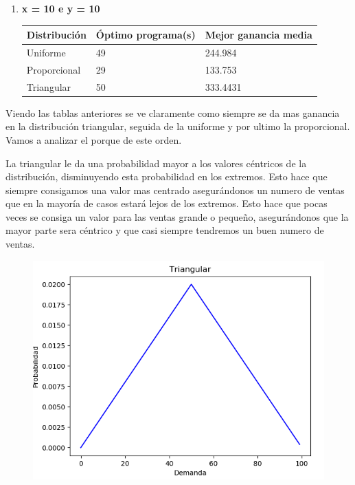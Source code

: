 \documentclass[]{article}
\begin{document}
\begin{enumerate}
\begin{table}[H]
\begin{center}
\begin{tabular}{|l|l|l|l|l|}
				\end{tabular}
			
			\label{tabla:sencilla}
		\end{center}
	\end{table}
	\item \textbf{ x = 10 e y = 10}
	\begin{table}[H]
		\begin{center}
				\begin{tabular}{|l|l|l|}
					
					\hline
					Distribución & Óptimo programa(s) & Mejor ganancia media\\
					\hline \hline
					Uniforme & 49 & 244.984
					\\ \hline
					Proporcional & 29& 133.753
					\\ \hline
					Triangular & 50 & 333.4431
					\\ \hline
					
				\end{tabular}
		
			\label{tabla:sencilla}
		\end{center}
	\end{table}
\end{enumerate}

Viendo las tablas anteriores se ve claramente como siempre se da mas ganancia en la distribución triangular, seguida de la uniforme y por ultimo la proporcional.
Vamos a analizar el porque de este orden.

La triangular le da una probabilidad mayor a los valores céntricos de la distribución, disminuyendo esta probabilidad en los extremos. Esto hace que siempre consigamos una valor mas centrado asegurándonos un numero de ventas que en la mayoría de casos estará lejos de los extremos. Esto hace que pocas veces se consiga un valor para las ventas grande o pequeño, asegurándonos que la mayor parte sera céntrico y que casi siempre tendremos un buen numero de ventas. 

\begin{figure}[H]
	\centering
	\includegraphics[width=1\linewidth]{img/screenshot002}
	\caption{}
	\label{fig:screenshot002}
\end{figure}
\end{document}
